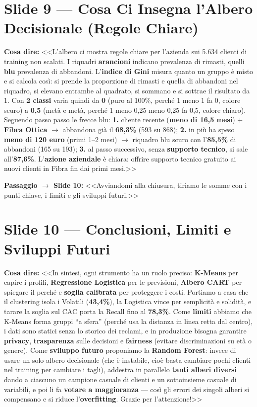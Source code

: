 \documentclass[10pt, a4paper]{article}
\newcommand{\say}[1]{%
  \par\vspace{2pt}\noindent\colorbox{SoftBox}{\parbox{\dimexpr\linewidth-2\fboxsep}{\raggedright\small\textbf{\color{PrimaryNavy}Cosa dire:} #1}}\par\vspace{2pt}%
}
\newcommand{\pass}[2]{%
  \par\vspace{1pt}\noindent\colorbox{PassBox}{\parbox{\dimexpr\linewidth-2\fboxsep}{\raggedright\footnotesize\textbf{\color{AccentAmber}Passaggio $\rightarrow$ Slide #1:} <<#2>>}}\par%
}
\newcommand{\slideblock}[3]{%
  \noindent\begin{minipage}{\linewidth}
    \section*{#1}
    \say{#2}
    #3
  \end{minipage}\par\vspace{6pt}%
}
\begin{document}
\slideblock{Slide 9 --- Cosa Ci Insegna l'Albero Decisionale (Regole Chiare)}{%
<<L'albero ci mostra regole chiare per l'azienda sui 5.634 clienti di training non scalati. I riquadri \textbf{arancioni} indicano prevalenza di rimasti, quelli \textbf{blu} prevalenza di abbandoni. L'\textbf{indice di Gini} misura quanto un gruppo è misto e si calcola così: si prende la proporzione di rimasti e quella di abbandoni nel riquadro, si elevano entrambe al quadrato, si sommano e si sottrae il risultato da 1. Con \textbf{2 classi} varia quindi da \textbf{0} (puro al 100\%, perché 1 meno 1 fa 0, colore scuro) a \textbf{0,5} (metà e metà, perché 1 meno 0,25 meno 0,25 fa 0,5, colore chiaro). Seguendo passo passo le frecce blu:
\textbf{1.} cliente recente (\textbf{meno di 16,5 mesi}) + \textbf{Fibra Ottica} $\rightarrow$ abbandona già il \textbf{68,3\%} (593 su 868);
\textbf{2.} in più ha speso \textbf{meno di 120 euro} (primi 1--2 mesi) $\rightarrow$ riquadro blu scuro con l'\textbf{85,5\%} di abbandoni (165 su 193);
\textbf{3.} al passo successivo, senza \textbf{supporto tecnico}, si sale all'\textbf{87,6\%}.
L'\textbf{azione aziendale} è chiara: offrire supporto tecnico gratuito ai nuovi clienti in Fibra fin dai primi mesi.>>%
}{\pass{10}{Avviandomi alla chiusura, tiriamo le somme con i punti chiave, i limiti e gli sviluppi futuri.}}

\slideblock{Slide 10 --- Conclusioni, Limiti e Sviluppi Futuri}{%
<<In sintesi, ogni strumento ha un ruolo preciso: \textbf{K-Means} per capire i profili, \textbf{Regressione Logistica} per le previsioni, \textbf{Albero CART} per spiegare il perché e \textbf{soglia calibrata} per proteggere i costi. Portiamo a casa che il clustering isola i Volatili (\textbf{43,4\%}), la Logistica vince per semplicità e solidità, e tarare la soglia sul CAC porta la Recall fino al \textbf{78,3\%}. Come \textbf{limiti} abbiamo che K-Means forma gruppi ``a sfera'' (perché usa la distanza in linea retta dal centro), i dati sono statici senza lo storico dei reclami, e in produzione bisogna garantire \textbf{privacy}, \textbf{trasparenza} sulle decisioni e \textbf{fairness} (evitare discriminazioni su età o genere). Come \textbf{sviluppo futuro} proponiamo la \textbf{Random Forest}: invece di usare un solo albero decisionale (che è instabile, cioè basta cambiare pochi clienti nel training per cambiare i tagli), addestra in parallelo \textbf{tanti alberi diversi} dando a ciascuno un campione casuale di clienti e un sottoinsieme casuale di variabili, e poi li fa \textbf{votare a maggioranza} --- così gli errori dei singoli alberi si compensano e si riduce l'\textbf{overfitting}. Grazie per l'attenzione!>>%
}{}
\end{document}
